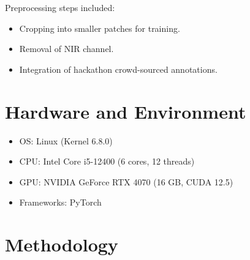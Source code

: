 \documentclass[rnd]{mas_proposal}
\begin{document}
Preprocessing steps included:
\begin{itemize}
    \item Cropping into smaller patches for training.  
    \item Removal of NIR channel.  
    \item Integration of hackathon crowd-sourced annotations.  
\end{itemize}

\section{Hardware and Environment}
\begin{itemize}
    \item OS: Linux (Kernel 6.8.0)  
    \item CPU: Intel Core i5-12400 (6 cores, 12 threads)  
    \item GPU: NVIDIA GeForce RTX 4070 (16 GB, CUDA 12.5)  
    \item Frameworks: PyTorch
\end{itemize}

\section{Methodology}
\end{document}
